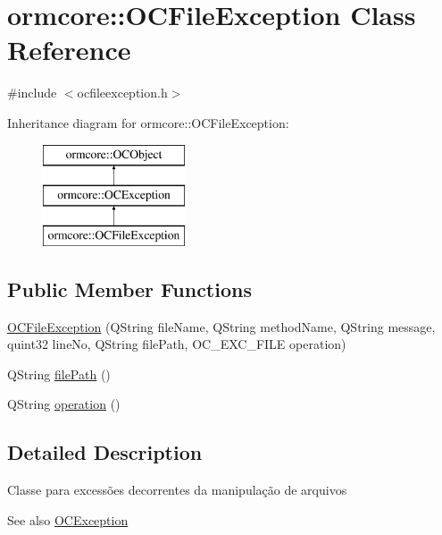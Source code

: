 \hypertarget{classormcore_1_1_o_c_file_exception}{
\section{ormcore\-:\-:\-O\-C\-File\-Exception \-Class \-Reference}
\label{classormcore_1_1_o_c_file_exception}
}


{\ttfamily \#include $<$ocfileexception.\-h$>$}

\-Inheritance diagram for ormcore\-:\-:\-O\-C\-File\-Exception\-:\begin{figure}[H]
\begin{center}
\leavevmode
\includegraphics[height=3.000000cm]{classormcore_1_1_o_c_file_exception}
\end{center}
\end{figure}
\subsection*{\-Public \-Member \-Functions}
\begin{DoxyCompactItemize}
\item 
\hyperlink{classormcore_1_1_o_c_file_exception_a834e1e6be5f4c7f3977588c109252e7f}{\-O\-C\-File\-Exception} (\-Q\-String file\-Name, \-Q\-String method\-Name, \-Q\-String message, quint32 line\-No, \-Q\-String file\-Path, \-O\-C\-\_\-\-E\-X\-C\-\_\-\-F\-I\-L\-E operation)
\item 
\-Q\-String \hyperlink{classormcore_1_1_o_c_file_exception_a7ead8200a8458159cba5ffbe8348871c}{file\-Path} ()
\item 
\-Q\-String \hyperlink{classormcore_1_1_o_c_file_exception_a328592db4c7f3ef87ad0332da1e44335}{operation} ()
\end{DoxyCompactItemize}


\subsection{\-Detailed \-Description}
\-Classe para excessões decorrentes da manipulação de arquivos \begin{DoxySeeAlso}{\-See also}
\hyperlink{classormcore_1_1_o_c_exception}{\-O\-C\-Exception} 
\end{DoxySeeAlso}


